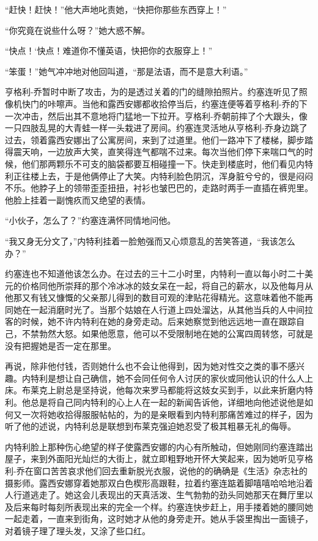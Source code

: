    “赶快！赶快！”他大声地叱责她，“快把你那些东西穿上！”

    “你究竟在说些什么呀？”她大惑不解。

    “快点！‘快点！难道你不懂英语，快把你的衣服穿上！”

    “笨蛋！”她气冲冲地对他回叫道，“那是法语，而不是意大利语。”

    亨格利-乔暂时中断了攻击，为的是透过关着的门的缝隙拍照片。约塞连听见了照像机快门的咔嚓声。当他和露西安娜都收拾停当后，约塞连便等着亨格利-乔的下一次冲击，然后出其不意地将门猛地一下拉开。亨格利-乔朝前摔了个大跟头，像一只四肢乱晃的大青蛙一样一头栽进了房间。约塞连灵活地从亨格利-乔身边跳了过去，领着露西安娜出了公寓房间，来到了过道里。他们一路冲下了楼梯，脚步踏得震天响，一边放声大笑，直笑得连气都喘不过来。每次当他们停下来喘口气的时候，他们那两颗乐不可支的脑袋都要互相碰撞一下。快走到楼底时，他们看见内特利正往楼上去，于是他俩停止了大笑。内特利脸色阴沉，浑身脏兮兮的，很是闷闷不乐。他脖子上的领带歪歪扭扭，衬衫也皱巴巴的，走路时两手一直插在裤兜里。他脸上挂着一副愧疚而又绝望的表情。

    “小伙子，怎么了？”约塞连满怀同情地问他。

    “我又身无分文了，”内特利挂着一脸勉强而又心烦意乱的苦笑答道，“我该怎么办？”

    约塞连也不知道他该怎么办。在过去的三十二小时里，内特利一直以每小时二十美元的价格同他所崇拜的那个冷冰冰的妓女呆在一起，将自己的薪水，以及他每月从他那又有钱又慷慨的父亲那儿得到的数目可观的津贴花得精光。这意味着他不能再同她在一起消磨时光了。当那个姑娘在人行道上四处溜达，从其他当兵的人中间拉客的时候，她不许内特利在她的身旁走动。后来她察觉到他远远地一直在跟踪自己，不禁勃然大怒。如果他愿意，他可以不受限制地在她的公寓四周转悠，可就是没有把握她是否一定在那里。

    再说，除非他付钱，否则她什么也不会让他得到，因为她对性交之类的事不感兴趣。内特利是想让自己确信，她不会同任何令人讨厌的家伙或同他认识的什么人上床。布莱克上尉总是坚持说，他每次来罗马都能将这妓女买到手，以此来折磨内特利。他总是将自己同内特利的心上人在一起的新闻告诉他，详细地向他述说他是如何又一次将她收拾得服服帖帖的，为的是亲眼看到内特利那痛苦难过的样子，因为听了他的述说，内特利总是联想到布莱克强迫她忍受了极其粗暴无礼的侮辱。
 


    内特利脸上那种伤心绝望的样子使露西安娜的内心有所触动，但她刚同约塞连踏出屋子，来到外面阳光灿烂的大街上，就立即粗野地开怀大笑起来，因为她听见亨格利-乔在窗口苦苦哀求他们回去重新脱光衣服，说他的的确确是《生活》杂志社的摄影师。露西安娜穿着她那双白色楔形高跟鞋，拉着约塞连踮着脚嘻嘻哈哈地沿着人行道逃走了。她这会儿表现出的天真活泼、生气勃勃的劲头同她那天在舞厅里以及后来每时每刻所表现出来的完全一个样。约塞连快步赶上，用手搂着她的腰同她一起走着，一直来到街角，这时她才从他的身旁走开。她从手袋里掏出一面镜子，对着镜子理了理头发，又涂了些口红。

